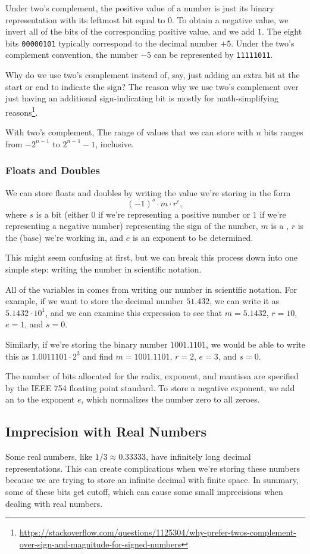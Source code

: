 Under two's complement, the positive value of a number is just its binary representation with its leftmost bit equal to $0$. To obtain a negative value, we invert all of the bits of the corresponding positive value, and we add $1$. The eight bits \verb!00000101! typically correspond to the decimal number $+5$. Under the two's complement convention, the number $-5$ can be represented by \verb!11111011!.

Why do we use two's complement instead of, say, just adding an extra bit at the start or end to indicate the sign? The reason why we use two's complement over just having an additional sign-indicating bit is mostly for math-simplifying reasons\footnote{\url{https://stackoverflow.com/questions/1125304/why-prefer-twos-complement-over-sign-and-magnitude-for-signed-numbers}}. 


With two's complement, The range of values that we can store with $n$ bits ranges from $-2^{n - 1}$ to $2^{n - 1} - 1$, inclusive.

\subsubsection{Floats and Doubles}
We can store floats and doubles by writing the value we're storing in the form \begin{equation}
\label{fp:rep}
(-1)^{s} \cdot m \cdot r^{e},
\end{equation}
where $s$ is a bit (either $0$ if we're representing a positive number or $1$ if we're representing a negative number) representing the sign of the number, $m$ is a , $r$ is the  (base) we're working in, and $e$ is an exponent to be determined.   


This might seem confusing at first, but we can break this process down into one simple step: writing the number in scientific notation.


All of the variables in  comes from writing our number in scientific notation. For example, if we want to store the decimal number $51.432$, we can write it as $5.1432 \cdot 10^{1}$, and we can examine this expression to see that $m = 5.1432$, $r = 10$, $e = 1$, and $s = 0$.  

Similarly, if we're storing the binary number $1001.1101$, we would be able to write this as $1.0011101 \cdot 2^{3}$ and find $m = 1001.1101$, $r = 2$, $e = 3$, and $s = 0$. 


The number of bits allocated for the radix, exponent, and mantissa are specified by the IEEE 754 floating point standard. To store a negative exponent, we add an  to the exponent $e$, which normalizes the number zero to all zeroes. 


\subsection{Imprecision with Real Numbers}

Some real numbers, like $1/3 \approx 0.33333$, have infinitely long decimal representations. This can create complications when we're storing these numbers because we are trying to store an infinite decimal with finite space. In summary, some of these bits get cutoff, which can cause some small imprecisions when dealing with real numbers. 